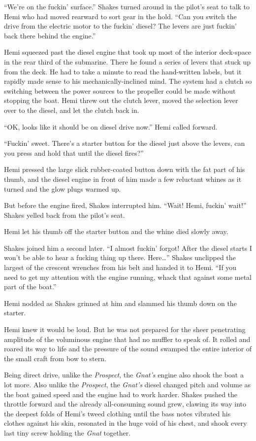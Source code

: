\documentclass[
]{scrbook}
\begin{document}
``We're on the fuckin' surface.'' Shakes turned around in the pilot's
seat to talk to Hemi who had moved rearward to sort gear in the hold.
``Can you switch the drive from the electric motor to the fuckin'
diesel? The levers are just fuckin' back there behind the engine.''

Hemi squeezed past the diesel engine that took up most of the interior
deck-space in the rear third of the submarine. There he found a series
of levers that stuck up from the deck. He had to take a minute to read
the hand-written labels, but it rapidly made sense to his
mechanically-inclined mind. The system had a clutch so switching between
the power sources to the propeller could be made without stopping the
boat. Hemi threw out the clutch lever, moved the selection lever over to
the diesel, and let the clutch back in.

``OK, looks like it should be on diesel drive now.'' Hemi called
forward.

``Fuckin' sweet. There's a starter button for the diesel just above the
levers, can you press and hold that until the diesel fires?''

Hemi pressed the large slick rubber-coated button down with the fat part
of his thumb, and the diesel engine in front of him made a few reluctant
whines as it turned and the glow plugs warmed up.

But before the engine fired, Shakes interrupted him. ``Wait! Hemi,
fuckin' wait!'' Shakes yelled back from the pilot's seat.

Hemi let his thumb off the starter button and the whine died slowly
away.

Shakes joined him a second later. ``I almost fuckin' forgot! After the
diesel starts I won't be able to hear a fucking thing up there.
Here\ldots{}'' Shakes unclipped the largest of the crescent wrenches
from his belt and handed it to Hemi. ``If you need to get my attention
with the engine running, whack that against some metal part of the
boat.''

Hemi nodded as Shakes grinned at him and slammed his thumb down on the
starter.

Hemi knew it would be loud. But he was not prepared for the sheer
penetrating amplitude of the voluminous engine that had no muffler to
speak of. It rolled and roared its way to life and the pressure of the
sound swamped the entire interior of the small craft from bow to stern.

Being direct drive, unlike the \emph{Prospect}, the \emph{Gnat's} engine
also shook the boat a lot more. Also unlike the \emph{Prospect}, the
\emph{Gnat's} diesel changed pitch and volume as the boat gained speed
and the engine had to work harder. Shakes pushed the throttle forward
and the already all-consuming sound grew, clawing its way into the
deepest folds of Hemi's tweed clothing until the bass notes vibrated his
clothes against his skin, resonated in the huge void of his chest, and
shook every last tiny screw holding the \emph{Gnat} together.
\end{document}

